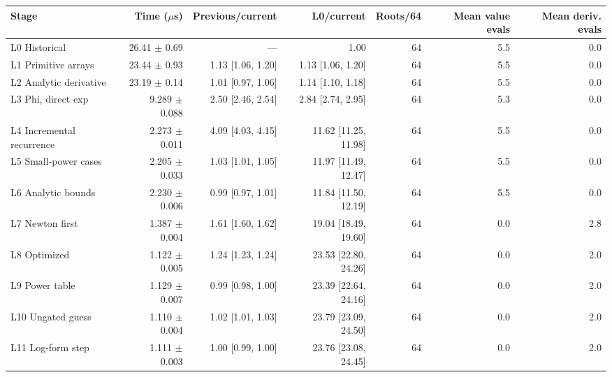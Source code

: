 \begin{tabular}{lrrrrrr}
\toprule
Stage & Time ($\mu$s) & Previous/current & L0/current & Roots/64 & Mean value evals & Mean deriv. evals \\
\midrule
L0 Historical & 26.41 $\pm$ 0.69 & --- & 1.00 & 64 & 5.5 & 0.0 \\
L1 Primitive arrays & 23.44 $\pm$ 0.93 & 1.13 [1.06, 1.20] & 1.13 [1.06, 1.20] & 64 & 5.5 & 0.0 \\
L2 Analytic derivative & 23.19 $\pm$ 0.14 & 1.01 [0.97, 1.06] & 1.14 [1.10, 1.18] & 64 & 5.5 & 0.0 \\
L3 Phi, direct exp & 9.289 $\pm$ 0.088 & 2.50 [2.46, 2.54] & 2.84 [2.74, 2.95] & 64 & 5.3 & 0.0 \\
L4 Incremental recurrence & 2.273 $\pm$ 0.011 & 4.09 [4.03, 4.15] & 11.62 [11.25, 11.98] & 64 & 5.5 & 0.0 \\
L5 Small-power cases & 2.205 $\pm$ 0.033 & 1.03 [1.01, 1.05] & 11.97 [11.49, 12.47] & 64 & 5.5 & 0.0 \\
L6 Analytic bounds & 2.230 $\pm$ 0.006 & 0.99 [0.97, 1.01] & 11.84 [11.50, 12.19] & 64 & 5.5 & 0.0 \\
L7 Newton first & 1.387 $\pm$ 0.004 & 1.61 [1.60, 1.62] & 19.04 [18.49, 19.60] & 64 & 0.0 & 2.8 \\
L8 Optimized & 1.122 $\pm$ 0.005 & 1.24 [1.23, 1.24] & 23.53 [22.80, 24.26] & 64 & 0.0 & 2.0 \\
L9 Power table & 1.129 $\pm$ 0.007 & 0.99 [0.98, 1.00] & 23.39 [22.64, 24.16] & 64 & 0.0 & 2.0 \\
L10 Ungated guess & 1.110 $\pm$ 0.004 & 1.02 [1.01, 1.03] & 23.79 [23.09, 24.50] & 64 & 0.0 & 2.0 \\
L11 Log-form step & 1.111 $\pm$ 0.003 & 1.00 [0.99, 1.00] & 23.76 [23.08, 24.45] & 64 & 0.0 & 2.0 \\
\bottomrule
\end{tabular}
